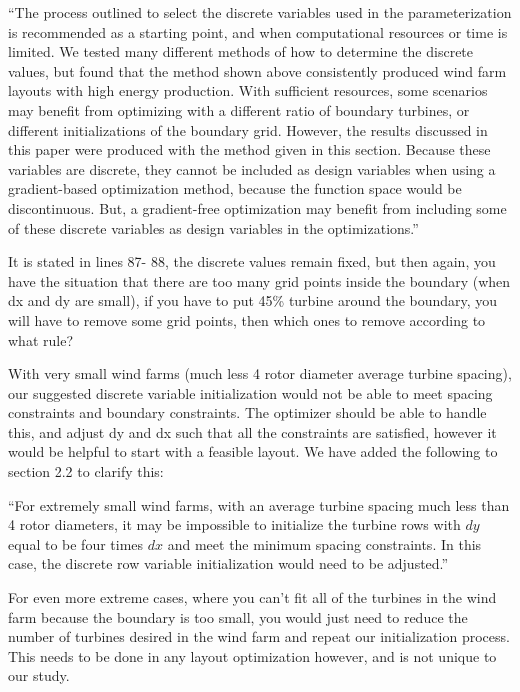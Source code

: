\documentclass[12pt]{report}
\begin{document}
\smallskip
``The process outlined to select the discrete variables used in the parameterization is recommended as a starting point, and when computational resources or time is limited. We tested many different methods of how to determine the discrete values, but found that the method shown above consistently produced wind farm layouts with high energy production. With sufficient resources, some scenarios may benefit from optimizing with a different ratio of boundary turbines, or different initializations of the boundary grid. However, the results discussed in this paper were produced with the method given in this section. Because these variables are discrete, they cannot be included as design variables when using a gradient-based optimization method, because the function space would be discontinuous. But, a gradient-free optimization may benefit from including some of these discrete variables as design variables in the optimizations.''

\color{black}
\bigskip

It is stated in lines 87- 88, the discrete values remain fixed, but then again, you have the situation that there are too many grid points inside the boundary (when dx and dy are small), if you have to put 45\% turbine around the boundary, you will have to remove some grid points, then which ones to remove according to what rule?

\bigskip
\color{blue}

With very small wind farms (much less 4 rotor diameter average turbine spacing), our suggested discrete variable initialization would not be able to meet spacing constraints and boundary constraints. The optimizer should be able to handle this, and adjust dy and dx such that all the constraints are satisfied, however it would be helpful to start with a feasible layout. We have added the following to section 2.2 to clarify this:

\smallskip
``For extremely small wind farms, with an average turbine spacing much less than 4 rotor diameters, it may be impossible to initialize the turbine rows with $dy$ equal to be four times $dx$ and meet the minimum spacing constraints. In this case, the discrete row variable initialization would need to be adjusted.''

\smallskip
For even more extreme cases, where you can't fit all of the turbines in the wind farm because the boundary is too small, you would just need to reduce the number of turbines desired in the wind farm and repeat our initialization process. This needs to be done in any layout optimization however, and is not unique to our study. 
\end{document}

